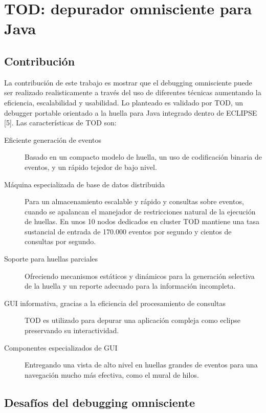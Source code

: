 \documentclass[12pt,a4paper]{report}
\begin{document}
	\section{TOD: depurador omnisciente para Java}
		\subsection{Contribución}

La contribución de este trabajo es mostrar que el debugging omnisciente puede ser realizado realisticamente a través del uso de diferentes técnicas aumentando la eficiencia, escalabilidad y usabilidad.  Lo planteado es validado por TOD, un debugger portable orientado a la huella para Java integrado dentro de ECLIPSE [5].  Las características de TOD son:
\begin{description}
	\item[Eficiente generación de eventos] Basado en un compacto modelo de huella, un uso de codificación binaria de eventos, y un rápido tejedor de bajo nivel.

	\item[Máquina especializada de base de datos distribuida] Para un almacenamiento escalable y rápido y consultas sobre eventos, cuando se apalancan el manejador de restricciones natural de la ejecución de huellas.  En unos 10 nodos dedicados en cluster TOD mantiene una tasa sustancial de entrada de 170.000 eventos por segundo y cientos de consultas por segundo.

	\item[Soporte para huellas parciales] Ofreciendo mecanismos estáticos y dinámicos para la generación selectiva de la huella y un reporte adecuado para la información incompleta.

	\item[GUI informativa, gracias a la eficiencia del procesamiento de consultas] TOD es utilizado para depurar una aplicación compleja como eclipse preservando su interactividad.

	\item[Componentes especializados de GUI] Entregando una vista de alto nivel en huellas grandes de eventos para una navegación mucho más efectiva, como el mural de hilos.
\end{description}


		\subsection[Desafíos]{Desafíos del debugging omnisciente}
\end{document}
